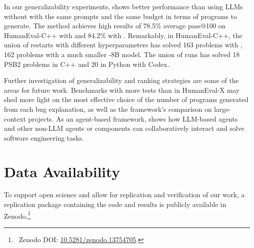 In our generalizability experiments, \method{} shows better performance than using LLMs without \method{} with the same prompts and the same budget in terms of programs to generate.
The method achieves high results of 78.5\% average pass@100 on HumanEval-C++ with \gpt{} and 84.2\% with \llama{}.
Remarkably, in HumanEval-C++, the union of \method{} restarts with different hyperparameters has solved 163 problems with \gpt{}, 162 problems with a much smaller \llama{}-8B model.
The union of \method{} runs has solved 18 PSB2 problems in C++ and 20 in Python with Codex. 

Further investigation of \method{} generalizability and ranking strategies are some of the areas for future work. 
Benchmarks with more tests than in HumanEval-X may shed more light on the most effective choice of the number of programs generated from each bug explanation, as well as the framework's comparison on large-context projects. 
As an agent-based framework, \method{} shows how LLM-based agents and other non-LLM agents or components can collaboratively interact and solve software engineering tasks.

\section*{Data Availability}
To support open science and allow for replication and verification of our work, a replication package containing the code and results is publicly available in Zenodo.\footnote{~Zenodo DOI: \href{https://doi.org/10.5281/zenodo.13754705}{10.5281/zenodo.13754705}.
}
